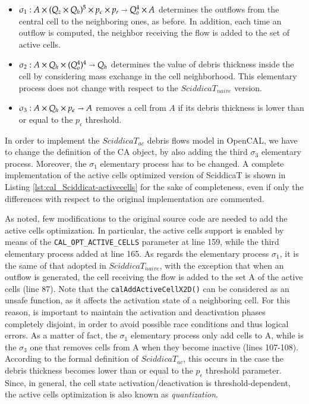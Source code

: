 \begin{itemize}
\item $\sigma_1 : A \times (Q_z \times Q_h)^5 \times p_\epsilon \times p_r
  \shortrightarrow Q_o^4 \times A$ determines the outflows from the
  central cell to the neighboring ones, as before. In addition, each
  time an outflow is computed, the neighbor receiving the flow is
  added to the set of active cells.

\item $\sigma_2: A \times Q_h \times (Q_o^4)^4 \shortrightarrow Q_h$ determines
  the value of debris thickness inside the cell by considering mass
  exchange in the cell neighborhood. This elementary process does not
  change with respect to the $SciddicaT_{naive}$ version.

\item $\sigma_3: A \times Q_h \times p_\epsilon \shortrightarrow A$
  removes a cell from $A$ if its debris thickness is lower than or
  equal to the $p_\epsilon$ threshold.
\end{itemize}

In order to implement the $SciddicaT_{ac}$ debris flows model in
OpenCAL, we have to change the definition of the CA object, by also
adding the third $\sigma_3$ elementary process. Moreover, the
$\sigma_1$ elementary process has to be changed. A complete
implementation of the active cells optimized version of SciddicaT is
shown in Listing \ref{lst:cal_Sciddicat-activecells} for the sake of
completeness, even if only the differences with respect to the
original implementation are commented.





As noted, few modifications to the original source code are needed to
add the active cells optimization. In particular, the active cells
support is enabled by means of the \verb'CAL_OPT_ACTIVE_CELLS'
parameter at line 159, while the third elementary process added at
line 165. As regards the elementary process $\sigma_1$, it is the same
of that adopted in $SciddicaT_{naive}$, with the exception that when
an outflow is generated, the cell receiving the flow is added to the
set A of the active cells (line 87). Note that the
\verb'calAddActiveCellX2D()' can be considered as an unsafe function,
as it affects the activation state of a neighboring cell. For this
reason, is important to maintain the activation and deactivation
phases completely disjoint, in order to avoid possible race conditions
and thus logical errors. As a matter of fact, the $\sigma_1$
elementary process only add cells to A, while is the $\sigma_3$ one
that removes cells from A when they become inactive (lines
107-108). According to the formal definition of $SciddicaT_{ac}$, this
occurs in the case the debris thickness becomes lower than or equal to
the $p_\epsilon$ threshold parameter. Since, in general, the cell state
activation/deactivation is threshold-dependent, the active cells
optimization is also known as \emph{quantization}.

